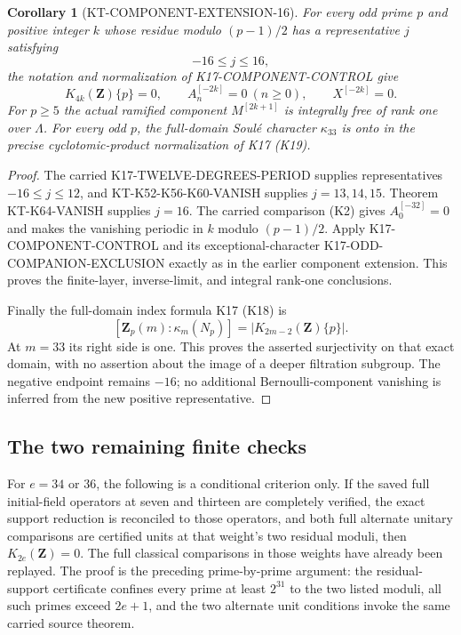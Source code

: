 \documentclass[11pt,a4paper]{article}
\newtheorem{corollary}[theorem]{Corollary}
\theoremstyle{definition}
\begin{document}
\begin{corollary}[KT-COMPONENT-EXTENSION-16]
For every odd prime $p$ and positive integer $k$ whose residue
modulo $(p-1)/2$ has a representative $j$ satisfying
\[
                              -16\leq j\leq16,
\]
the notation and normalization of K17-COMPONENT-CONTROL give
\[
 K_{4k}(\mathbf Z)\{p\}=0,\qquad
 A_n^{[-2k]}=0\ (n\geq0),\qquad X^{[-2k]}=0.
\]
For $p\geq5$ the actual ramified component $M^{[2k+1]}$ is
integrally free of rank one over $\Lambda$.  For every odd
$p$, the full-domain Soul\'e character $\kappa_{33}$ is onto
in the precise cyclotomic-product normalization of K17 (K19).
\end{corollary}
\begin{proof}
The carried K17-TWELVE-DEGREES-PERIOD supplies representatives
$-16\leq j\leq12$, and KT-K52-K56-K60-VANISH supplies
$j=13,14,15$.  Theorem KT-K64-VANISH supplies $j=16$.
The carried comparison (K2) gives $A_0^{[-32]}=0$ and makes
the vanishing periodic in $k$ modulo $(p-1)/2$.  Apply
K17-COMPONENT-CONTROL and its exceptional-character
K17-ODD-COMPANION-EXCLUSION exactly as in the earlier
component extension.  This proves the finite-layer,
inverse-limit, and integral rank-one conclusions.

Finally the full-domain index formula K17 (K18) is
\[
 [\mathbf Z_p(m):\kappa_m(N_p)]
                      =|K_{2m-2}(\mathbf Z)\{p\}|.
\]
At $m=33$ its right side is one.  This proves the asserted
surjectivity on that exact domain, with no assertion about
the image of a deeper filtration subgroup.  The negative
endpoint remains $-16$; no additional Bernoulli-component
vanishing is inferred from the new positive representative.
\end{proof}

\subsection{The two remaining finite checks}

For $e=34$ or $36$, the following is a conditional criterion
only.  If the saved full initial-field operators at seven and
thirteen are completely verified, the exact support reduction
is reconciled to those operators, and both full alternate
unitary comparisons are certified units at that weight's
two residual moduli, then $K_{2e}(\mathbf Z)=0$.  The full
classical comparisons in those weights have already been
replayed.  The proof is the preceding prime-by-prime argument:
the residual-support certificate confines every prime at least
$2^{31}$ to the two listed moduli, all such primes exceed
$2e+1$, and the two alternate unit conditions invoke the
same carried source theorem.
\end{document}
